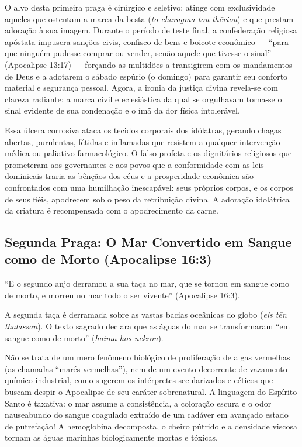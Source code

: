 O alvo desta primeira praga é cirúrgico e seletivo: atinge com exclusividade aqueles que ostentam a marca da besta (\textit{to charagma tou thēriou}) e que prestam adoração à sua imagem. Durante o período de teste final, a confederação religiosa apóstata impusera sanções civis, confisco de bens e boicote econômico — ``para que ninguém pudesse comprar ou vender, senão aquele que tivesse o sinal'' (Apocalipse 13:17) — forçando as multidões a transigirem com os mandamentos de Deus e a adotarem o sábado espúrio (o domingo) para garantir seu conforto material e segurança pessoal. Agora, a ironia da justiça divina revela-se com clareza radiante: a marca civil e eclesiástica da qual se orgulhavam torna-se o sinal evidente de sua condenação e o ímã da dor física intolerável.

Essa úlcera corrosiva ataca os tecidos corporais dos idólatras, gerando chagas abertas, purulentas, fétidas e inflamadas que resistem a qualquer intervenção médica ou paliativo farmacológico. O falso profeta e os dignitários religiosos que prometeram aos governantes e aos povos que a conformidade com as leis dominicais traria as bênçãos dos céus e a prosperidade econômica são confrontados com uma humilhação inescapável: seus próprios corpos, e os corpos de seus fiéis, apodrecem sob o peso da retribuição divina. A adoração idolátrica da criatura é recompensada com o apodrecimento da carne.



\subsection{Segunda Praga: O Mar Convertido em Sangue como de Morto (Apocalipse 16:3)}


``E o segundo anjo derramou a sua taça no mar, que se tornou em sangue como de morto, e morreu no mar todo o ser vivente'' (Apocalipse 16:3).

A segunda taça é derramada sobre as vastas bacias oceânicas do globo (\textit{eis tēn thalassan}). O texto sagrado declara que as águas do mar se transformaram ``em sangue como de morto'' (\textit{haima hōs nekrou}).

Não se trata de um mero fenômeno biológico de proliferação de algas vermelhas (as chamadas ``marés vermelhas''), nem de um evento decorrente de vazamento químico industrial, como sugerem os intérpretes secularizados e céticos que buscam despir o Apocalipse de seu caráter sobrenatural. A linguagem do Espírito Santo é taxativa: o mar assume a consistência, a coloração escura e o odor nauseabundo do sangue coagulado extraído de um cadáver em avançado estado de putrefação! A hemoglobina decomposta, o cheiro pútrido e a densidade viscosa tornam as águas marinhas biologicamente mortas e tóxicas.

